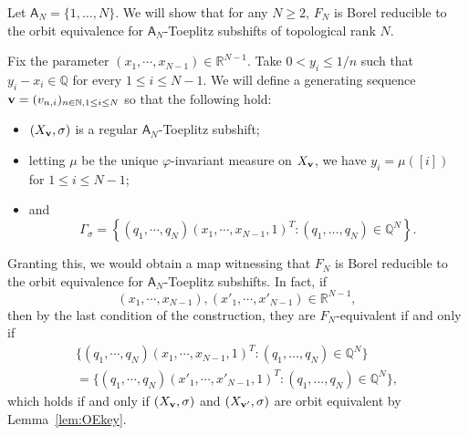 \documentclass{amsart}
\theoremstyle{definition}
\theoremstyle{problem}
\theoremstyle{remark}
\numberwithin{equation}{section}
\begin{document}
Let $\mathsf{A}_N=\{1, \dots, N\}$. We will show that for any $N\ge2$, $F_N$ is Borel reducible to the orbit equivalence for $\mathsf{A}_N$-Toeplitz subshifts of topological rank $N$.



Fix the parameter $(x_1,\cdots,x_{N-1})\in\mathbb{R}^{N-1}$. Take $0<y_i\le1/n$ such that $y_i-x_i\in\mathbb{Q}$ for every $1\le i\leq N-1$. We will define a generating sequence ${\bf v}=(v_{n,i})_{n\in\mathbb{N},1\le i\le N}$ so that the following hold:
\begin{itemize}
\item $(X_{\bf v},\sigma)$ is a regular $\mathsf{A}_N$-Toeplitz subshift;
\item letting $\mu$ be the unique $\varphi$-invariant measure on $X_{\bf v}$, we have $y_i=\mu([i])$ for $1\le i\leq N-1$;
\item and
 $$\Gamma_\sigma=\left\{(q_1,\cdots,q_N)(x_1,\cdots,x_{N-1},1)^T\colon (q_1,\dots, q_N)\in \mathbb{Q}^N\right\}.$$
\end{itemize}
Granting this, we would obtain a map witnessing that $F_N$ is Borel reducible to the orbit equivalence for $\mathsf{A}_N$-Toeplitz subshifts.  In fact, if $$(x_1,\cdots,x_{N-1}), (x'_1,\cdots,x'_{N-1})\in\mathbb{R}^{N-1},$$ then by the last condition of the construction, they are $F_N$-equivalent if and only if
$$\begin{array}{c} \{(q_1,\cdots,q_N)(x_1,\cdots,x_{N-1},1)^T\colon (q_1,\dots, q_N)\in\mathbb{Q}^N\} \\ =\{(q_1,\cdots,q_N)(x'_1,\cdots,x'_{N-1},1)^T\colon (q_1,\dots, q_N)\in\mathbb{Q}^N\},
\end{array}$$ 
which holds if and only if $(X_{\bf v},\sigma)$ and $(X_{{\bf v}'}, \sigma)$ are orbit equivalent by Lemma~\ref{lem:OEkey}.
\end{document}

